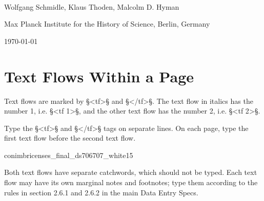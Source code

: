 \documentclass[fontsize=11pt, paper=a4, 
DIV15,
normalheadings,
parskip=half-, 
pointlessnumbers]{scrartcl}
\begin{document}
\begin{center}
{} \\[5mm]
\large Wolfgang Schmidle, Klaus Thoden, Malcolm D. Hyman

\normalsize Max Planck Institute for the History of Science, Berlin, Germany

\today
\end{center}


\section{Text Flows Within a Page}

\begin{mainrule}
Text flows are marked by §<tf>§ and §</tf>§. The text flow in italics has the number 1, i.e. §<tf 1>§, and the other text flow has the number 2, i.e. §<tf 2>§.
\end{mainrule}

\begin{clarification}
Type the §<tf>§ and §</tf>§ tags on separate lines. On each page, type the first text flow before the second text flow.
\end{clarification}

\vspace{3mm}
\begin{sampleImage}{conimbricenses_final_ds706707_white15}

\notTranscribed
\end{sampleImage}

\begin{note}
Both text flows have separate catchwords, which should not be typed. Each text flow may have its own marginal notes and footnotes; type them according to the rules in section 2.6.1 and 2.6.2 in the main Data Entry Specs. 
\end{note}

\end{document}
